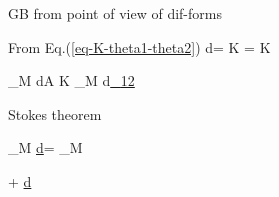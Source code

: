 \beq
{}\quad
{}
\eeq

GB from point of view of dif-forms

From Eq.(\ref{eq-K-theta1-theta2})
\beq
d= K 
\wedge {}=
K 
\eeq

\beq
\iint_M dA \; K\rarrow
\iint_M d\ul{\omega_{12}}
\eeq

Stokes theorem

\beq
\iint_M \ul{d\omega}=
\int_{\partial M}
\ul{\omega}
\eeq

\beq
\omega\rarrow \omega + \ul{d\alp}
\eeq


